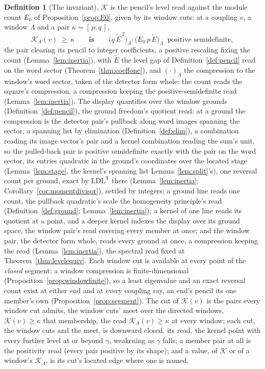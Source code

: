\documentclass[11pt]{article}
\theoremstyle{definition}
\newtheorem{definition}{Definition}
\begin{document}
\begin{definition}[The invariant]\label{def:K}
$\mathcal K$ is the pencil's level read against the module count $E_0$ of
Proposition~\ref{prop:E0}, given by its window cuts: at a coupling $v$, a
window $\Lambda$ and a pair $\kappa=[\,p:q\,]$,
\[
\mathcal K_\Lambda(v)\ \ge\ \kappa
\qquad\textbf{is}\qquad
\big(q\,\tilde E^{\,2}\big)_\Lambda
:\big(E_0\,p\,\tilde E\big)_\Lambda
\ \text{ positive semidefinite},
\]
the pair clearing its pencil to integer coefficients, a
positive rescaling fixing the count (Lemma~\ref{lem:inertia}),
with $\tilde E$ the level gap of Definition~\ref{def:pencil} read on the word sector
(Theorem~\ref{thm:coeffone}), and $(\cdot)_\Lambda$ the compression to the
window's word sector, taken of the detector form whole: the count reads the square's compression, a compression keeping the
positive-semidefinite read (Lemma~\ref{lem:inertia}). The display
quantifies over the window grounds (Definition~\ref{def:pencil}),
the ground freedom's quotient read: at a ground the compression is
the detector pair's pullback along word images spanning the
sector, a spanning list by elimination (Definition~\ref{def:elim}),
a combination reading its image vector's pair and a kernel
combination reading the sum's unit, so the pulled-back pair is
positive semidefinite exactly with the pair on the word sector,
its entries quadratic in the ground's coordinates over the located
stage (Lemma~\ref{lem:stage}, the kernel's spanning list
Lemma~\ref{lem:split}'s), one reversal count per ground, exact by
$\mathrm{LDL}^{\mathsf T}$ there (Lemma~\ref{lem:inertia};
Corollary~\ref{cor:momentdivisor}), settled by integers; a ground
line reads one count, the pullback quadratic's scale the
homogeneity principle's read (Definition~\ref{def:ground};
Lemma~\ref{lem:inertia}); a kernel of one line reads its quotient
at a point, and a deeper kernel indexes the display over its
ground space, the window pair's read covering every member at
once; and the window pair, the detector form whole, reads every
ground at once, a compression keeping the read
(Lemma~\ref{lem:inertia}), the spectral read fixed at
Theorem~\ref{thm:levelequiv}. Each window cut is available at every point of the
\emph{closed} segment: a window compression is finite-dimensional
(Proposition~\ref{prop:windowfinite}), so a least eigenvalue and an
exact reversal count exist at either end and at every coupling ray, an
end's pencil its one member's own
(Proposition~\ref{prop:segment}). The cut of $\mathcal K(v)$ is the
pairs every window cut admits, the window cuts' meet over the
directed windows, $\mathcal K(v)\ge\kappa$ that membership, the
read $\mathcal K_\Lambda(v)\ge\kappa$ at every window; each cut,
the window cuts and the meet, is downward closed, its read, the
kernel point with every further level at or beyond $\gamma$,
weakening as $\gamma$ falls; a member pair at all is the positivity
read (every pair positive by its shape); and a value, of
$\mathcal K$ or of a window's $\mathcal K_\Lambda$, is its cut's
located edge where one is named.


\end{definition}
\end{document}
